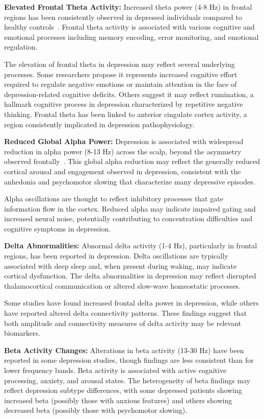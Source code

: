 \documentclass[blue,fullpaper]{ludusofficial}  %
\begin{document}
\textbf{Elevated Frontal Theta Activity:} Increased theta power (4-8 Hz) in frontal regions has been consistently observed in depressed individuals compared to healthy controls~\cite{knott2001eeg}. Frontal theta activity is associated with various cognitive and emotional processes including memory encoding, error monitoring, and emotional regulation.

The elevation of frontal theta in depression may reflect several underlying processes. Some researchers propose it represents increased cognitive effort required to regulate negative emotions or maintain attention in the face of depression-related cognitive deficits. Others suggest it may reflect rumination, a hallmark cognitive process in depression characterized by repetitive negative thinking. Frontal theta has been linked to anterior cingulate cortex activity, a region consistently implicated in depression pathophysiology.

\textbf{Reduced Global Alpha Power:} Depression is associated with widespread reduction in alpha power (8-13 Hz) across the scalp, beyond the asymmetry observed frontally~\cite{arns2015frontal}. This global alpha reduction may reflect the generally reduced cortical arousal and engagement observed in depression, consistent with the anhedonia and psychomotor slowing that characterize many depressive episodes.

Alpha oscillations are thought to reflect inhibitory processes that gate information flow in the cortex. Reduced alpha may indicate impaired gating and increased neural noise, potentially contributing to concentration difficulties and cognitive symptoms in depression.

\textbf{Delta Abnormalities:} Abnormal delta activity (1-4 Hz), particularly in frontal regions, has been reported in depression. Delta oscillations are typically associated with deep sleep and, when present during waking, may indicate cortical dysfunction. The delta abnormalities in depression may reflect disrupted thalamocortical communication or altered slow-wave homeostatic processes.

Some studies have found increased frontal delta power in depression, while others have reported altered delta connectivity patterns. These findings suggest that both amplitude and connectivity measures of delta activity may be relevant biomarkers.

\textbf{Beta Activity Changes:} Alterations in beta activity (13-30 Hz) have been reported in some depression studies, though findings are less consistent than for lower frequency bands. Beta activity is associated with active cognitive processing, anxiety, and arousal states. The heterogeneity of beta findings may reflect depression subtype differences, with some depressed patients showing increased beta (possibly those with anxious features) and others showing decreased beta (possibly those with psychomotor slowing).
\end{document}
